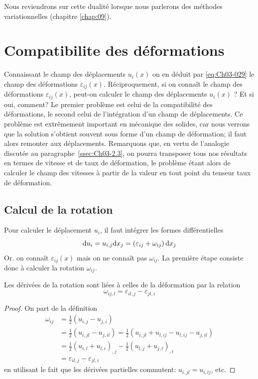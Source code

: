 Nous reviendrons sur cette dualité lorsque nous parlerons des méthodes variationnelles (chapitre \ref{chap:09}).
\section{Compatibilite des déformations}
Connaissant le champ des déplacements $u_i (x)$ on en déduit par \eqref{eq:Ch03-029} le champ des déformations $\varepsilon_{ij}(x)$.
Réciproquement, si on connaît le champ des déformations $\varepsilon_{ij}(x)$, peut-on calculer le champ des déplacements $u_i (x)$ ?
Et si oui, comment?
Le premier problème est celui de la compatibilité des déformations, le second celui de l'intégration d'un champ de déplacements.
Ce problème est extrêmement important en mécanique des solides, car nous verrons que la solution s'obtient souvent sous forme d'un champ de déformation; il faut alors remonter aux déplacements.
Remarquons que, en vertu de l'analogie discutée au paragraphe~\ref{ssec:Ch03-2.3}, on pourra transposer tous nos résultats en termes de vitesse et de taux de déformation, le problème étant alors de calculer le champ des vitesses à partir de la valeur en tout point du tenseur taux de déformation.
\subsection{Calcul de la rotation}
Pour calculer le déplacement $u_i$, il faut intégrer les formes différentielles 
\begin{equation}
    \mathrm{d} u_i = u_{i,j} \mathrm{d} x_j = \left( \varepsilon_{ij} + \omega_{ij} \right) \mathrm{d} x_j
    \label{eq:Ch03-051}
\end{equation}
Or. on connaît $\varepsilon_{ij}(x)$ mais on ne connaît pas $\omega_{ij}$.
La première étape consiste donc à calculer la rotation $\omega_{ij}$.
\begin{lem} \label{lem:Ch03-1}
    Les dérivées de la rotation sont liées à celles de la déformation par la relation
    \begin{equation}
        \omega_{ij,l} = \varepsilon_{il,j} - \varepsilon_{jl,i}
        \label{eq:Ch03-052}
    \end{equation}
\end{lem}
\begin{proof}
    On part de la définition 
    \begin{align*}
        \omega_{ij} &= \frac{1}{2} \left( u_{i,j} - u_{j,i} \right) \\
        &= \frac{1}{2} \left( u_{i,jl} - u_{j,il} \right) = \frac{1}{2} \left( u_{i,jl} + u_{l,ij} - u_{l,ij} - u_{j,il} \right) \\
        &= \frac{1}{2} \left( u_{i,l} + u_{l,i} \right)_{,j} - \frac{1}{2} \left( u_{l,j} + u_{j,l} \right)_{,i} \\
        &= \varepsilon_{il,j} - \varepsilon_{jl,i}
    \end{align*}
    en utilisant le fait que les dérivées partielles commutent: $u_{i,jl} = u_{i,lj}$, etc.
\end{proof}

